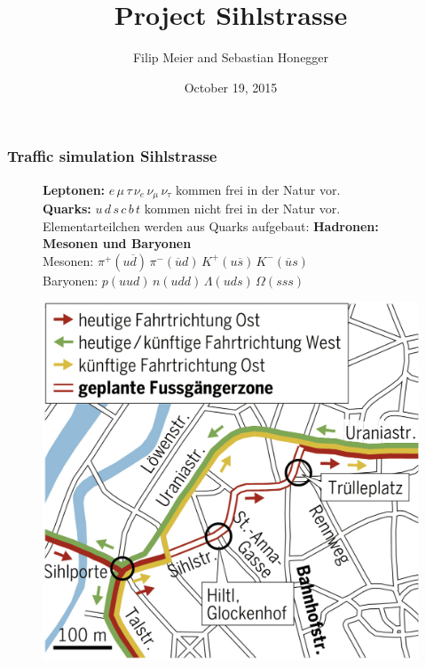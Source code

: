 \documentclass[9pt]{beamer}
\title{Project Sihlstrasse}
\institute[ETH Zurich] {Modelling and Simulating Social Systems\\ETH Zurich}
\author[Filip Meier and Sebastian Honegger]{Filip Meier and Sebastian Honegger}
\date{October 19, 2015}
\begin{document}
\begin{frame}
\frametitle{Traffic simulation Sihlstrasse}

\begin{figure}[H]
\begin{minipage}[t]{.20\textwidth}
\textbf{Leptonen:} $e\,\mu\,\tau\,\nu_e\,\nu_\mu\,\nu_\tau$ kommen frei in der Natur vor.\\
\textbf{Quarks:} $u\,d\,s\,c\,b\,t$ kommen nicht frei in der Natur vor.\\
Elementarteilchen werden aus Quarks aufgebaut: \textbf{Hadronen: Mesonen und Baryonen}\\
Mesonen: $\pi^+(u\overline{d})\,\pi^-(\overline{u}d)\,K^+(u\overline{s})\,K^-(\overline{u}s)$ \\
Baryonen: $p(uud)\, n(udd)\, \Lambda(uds)\, \Omega(sss)$
\end{minipage}\hfill
\begin{minipage}[t]{.25\textwidth}
	\centering
	\vspace{0pt}
\includegraphics[width=\textwidth]{Plan_Sihlstrasse.png}
\end{minipage}\hfill
\end{figure}



\end{frame}
\end{document}
